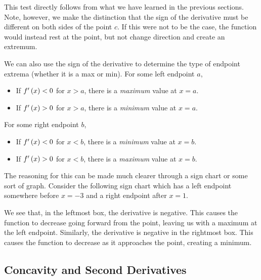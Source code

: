 This test directly follows from what we have learned in the previous sections. Note, however, we make the distinction that the sign of the derivative must be different on both sides of the point \( c \). If this were not to be the case, the function would instead rest at the point, but not change direction and create an extremum.

We can also use the sign of the derivative to determine the type of endpoint extrema (whether it is a max or min). For some left endpoint \( a \),

\begin{itemize}
    \item If \( f^\prime \left( x \right) < 0 \) for \( x > a \), there is a \textit{maximum} value at \( x = a \).
    \item If \( f^\prime \left( x \right) > 0 \) for \( x > a \), there is a \textit{minimum} value at \( x = a \).
\end{itemize}

For some right endpoint \( b \),

\begin{itemize}
    \item If \( f^\prime \left( x \right) < 0 \) for \( x < b \), there is a \textit{minimum} value at \( x = b \).
    \item If \( f^\prime \left( x \right) > 0 \) for \( x < b \), there is a \textit{maximum} value at \( x = b \).
\end{itemize}

The reasoning for this can be made much clearer through a sign chart or some sort of graph. Consider the following sign chart which has a left endpoint somewhere before \( x = -3 \) and a right endpoint after \( x = 1 \).

\begin{figure}[H]
    \centering
    
\end{figure}

We see that, in the leftmost box, the derivative is negative. This causes the function to decrease going forward from the point, leaving us with a maximum at the left endpoint. Similarly, the derivative is negative in the rightmost box. This causes the function to decrease as it approaches the point, creating a minimum.

\subsection{Concavity and Second Derivatives}

